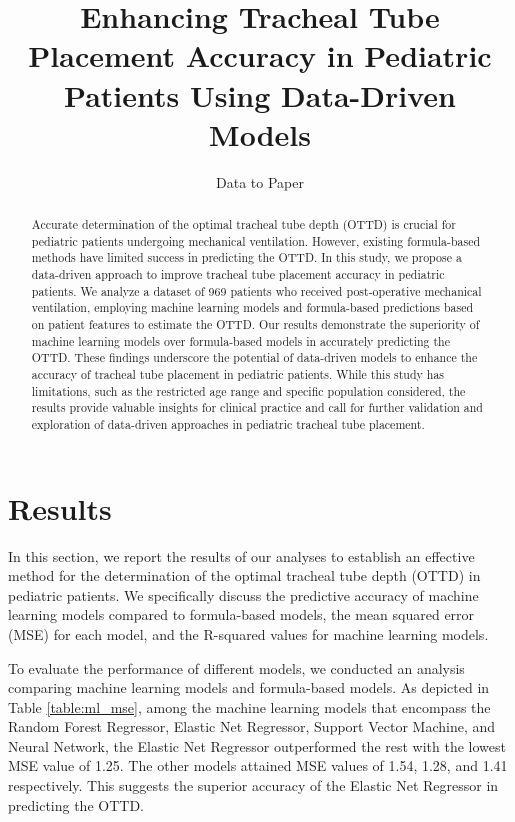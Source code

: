 \documentclass[11pt]{article}
\title{Enhancing Tracheal Tube Placement Accuracy in Pediatric Patients Using Data-Driven Models}
\author{Data to Paper}
\begin{document}
\maketitle
\begin{abstract}
Accurate determination of the optimal tracheal tube depth (OTTD) is crucial for pediatric patients undergoing mechanical ventilation. However, existing formula-based methods have limited success in predicting the OTTD. In this study, we propose a data-driven approach to improve tracheal tube placement accuracy in pediatric patients. We analyze a dataset of 969 patients who received post-operative mechanical ventilation, employing machine learning models and formula-based predictions based on patient features to estimate the OTTD. Our results demonstrate the superiority of machine learning models over formula-based models in accurately predicting the OTTD. These findings underscore the potential of data-driven models to enhance the accuracy of tracheal tube placement in pediatric patients. While this study has limitations, such as the restricted age range and specific population considered, the results provide valuable insights for clinical practice and call for further validation and exploration of data-driven approaches in pediatric tracheal tube placement.
\end{abstract}
\section*{Results}

In this section, we report the results of our analyses to establish an effective method for the determination of the optimal tracheal tube depth (OTTD) in pediatric patients. We specifically discuss the predictive accuracy of machine learning models compared to formula-based models, the mean squared error (MSE) for each model, and the R-squared values for machine learning models.

To evaluate the performance of different models, we conducted an analysis comparing machine learning models and formula-based models. As depicted in Table {}\ref{table:ml_mse}, among the machine learning models that encompass the Random Forest Regressor, Elastic Net Regressor, Support Vector Machine, and Neural Network, the Elastic Net Regressor outperformed the rest with the lowest MSE value of 1.25. The other models attained MSE values of 1.54, 1.28, and 1.41 respectively. This suggests the superior accuracy of the Elastic Net Regressor in predicting the OTTD.
\end{document}
